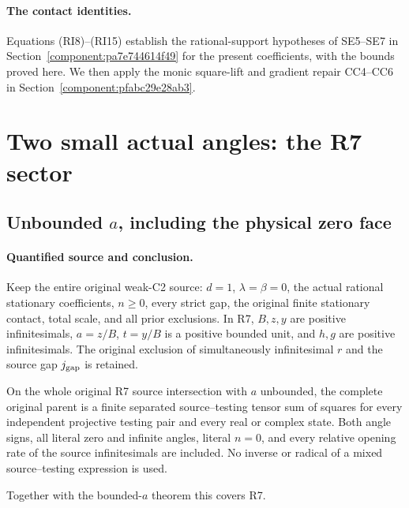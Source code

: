 \paragraph{The contact identities.}
Equations (RI8)--(RI15) establish the rational-support hypotheses of
SE5--SE7 in Section~\ref{component:pa7e744614f49} for the present
coefficients, with the bounds proved here. We then apply the monic
square-lift and gradient repair CC4--CC6 in
Section~\ref{component:pfabc29e28ab3}.

\section{Two small actual angles: the R7 sector}
\subsection{Unbounded $a$, including the physical zero face}
\label{component:p405d96527133}

\label{p405d96527133:sec:r7-unbounded-a}

\paragraph{Quantified source and conclusion.}
Keep the entire original weak-C2 source: $d=1$, $\lambda=\beta=0$,
the actual rational stationary coefficients, $n\ge0$, every strict gap,
the original finite stationary contact, total scale, and all prior
exclusions. In R7, $B,z,y$ are positive infinitesimals,
$a=z/B$, $t=y/B$ is a positive bounded unit, and $h,g$ are positive
infinitesimals. The original exclusion of simultaneously infinitesimal
$r$ and the source gap $j_{\rm gap}$ is retained.

\begin{theorem}
On the whole original R7 source intersection with $a$ unbounded,
the complete original parent is a finite separated source--testing
tensor sum of squares for every independent projective testing pair
and every real or complex state. Both angle signs, all literal zero
and infinite angles, literal $n=0$, and every relative opening rate
of the source infinitesimals are included. No inverse or radical of
a mixed source--testing expression is used.
\end{theorem}

Together with the bounded-$a$ theorem this covers R7.

